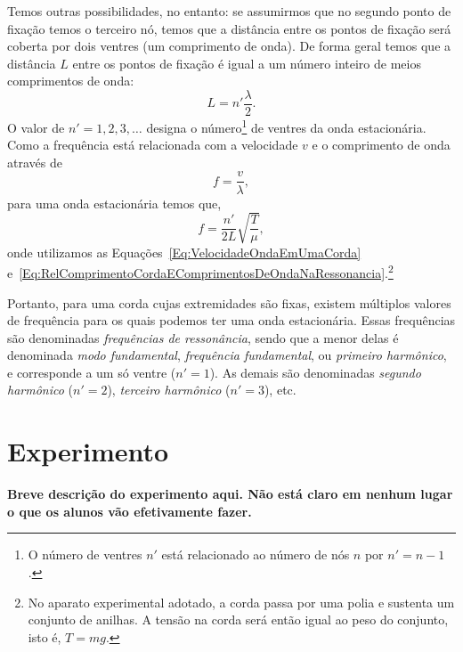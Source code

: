 Temos outras possibilidades, no entanto: se assumirmos que no segundo ponto de fixação temos o terceiro nó, temos que a distância entre os pontos de fixação será coberta por dois ventres (um comprimento de onda). De forma geral temos que a distância $L$ entre os pontos de fixação é igual a um número inteiro de meios comprimentos de onda:
\begin{equation}\label{Eq:RelComprimentoCordaEComprimentosDeOndaNaRessonancia}
    L = n'\frac{\lambda}{2}.
\end{equation}
%
O valor de $n' = 1, 2, 3, \dots$ designa o número\footnote{O número de ventres $n'$ está relacionado ao número de nós $n$ por $n'=n-1$.} de ventres da onda estacionária. Como a frequência está relacionada com a velocidade $v$ e o comprimento de onda através de
\begin{equation}
	f = \frac{v}{\lambda},
\end{equation}
%
para uma onda estacionária temos que,
\begin{equation}\label{Eq:RelacaoVariaveisOndasEstacionarias}
	f = \frac{n'}{2L}\sqrt{\frac{T}{\mu}},
\end{equation}
%
onde utilizamos as Equações~\eqref{Eq:VelocidadeOndaEmUmaCorda} e~\eqref{Eq:RelComprimentoCordaEComprimentosDeOndaNaRessonancia}.\footnote{No aparato experimental adotado, a corda passa por uma polia e sustenta um conjunto de anilhas. A tensão na corda será então igual ao peso do conjunto, isto é, $T = mg$.}

Portanto, para uma corda cujas extremidades são fixas, existem múltiplos valores de frequência para os quais podemos ter uma onda estacionária. Essas frequências são denominadas \emph{frequências de ressonância}, sendo que a menor delas é denominada \emph{modo fundamental}, \emph{frequência fundamental}, ou \emph{primeiro harmônico}, e corresponde a um só ventre ($n'=1$). As demais são denominadas \emph{segundo harmônico} ($n'=2$), \emph{terceiro harmônico} ($n'=3$), etc.

\section{Experimento}

\textbf{Breve descrição do experimento aqui. Não está claro em nenhum lugar o que os alunos vão efetivamente fazer.}

